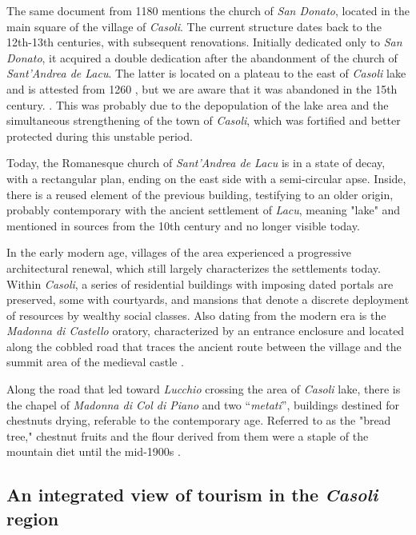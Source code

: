 \documentclass[sustainability,article,submit,pdftex,moreauthors]{Definitions/mdpi}
\begin{document}
The same document from 1180 mentions the church of \textit{San Donato}, located in the main square of the village of \emph{Casoli}. The current structure dates back to the 12th-13th centuries, with subsequent renovations. Initially dedicated only to \textit{San Donato}, it acquired a double dedication after the abandonment of the church of \textit{Sant'Andrea de Lacu}. The latter is located on a plateau to the east of \emph{Casoli} lake and is attested from 1260 \cite{ber18, gia96, cap17}, but we are aware that it was abandoned in the 15th century. \cite{gia96, con12}. This was probably due to the depopulation of the lake area and the simultaneous strengthening of the town of \emph{Casoli}, which was fortified and better protected during this unstable period.

Today, the Romanesque church of \textit{Sant'Andrea de Lacu} is in a state of decay, with a rectangular plan, ending on the east side with a semi-circular apse. Inside, there is a reused element of the previous building, testifying to an older origin, probably contemporary with the ancient settlement of \textit{Lacu}, meaning "lake" and mentioned in sources from the 10th century and no longer visible today.

In the early modern age, villages of the area experienced a progressive architectural renewal, which still largely characterizes the settlements today. Within \emph{Casoli}, a series of residential buildings with imposing dated portals are preserved, some with courtyards, and mansions that denote a discrete deployment of resources by wealthy social classes. Also dating from the modern era is the \textit{Madonna di Castello} oratory, characterized by an entrance enclosure and located along the cobbled road that traces the ancient route between the village and the summit area of the medieval castle \cite{gia96}.

Along the road that led toward \textit{Lucchio} crossing the area of \emph{Casoli} lake, there is the chapel of \textit{Madonna di Col di Piano} and two “\textit{metati}”, buildings destined for chestnuts drying, referable to the contemporary age. Referred to as the "bread tree," chestnut fruits and the flour derived from them were a staple of the mountain diet until the mid-1900s \cite{buc92, puc10}.


\subsection{An integrated view of tourism in the \emph{Casoli} region \label{sec:tourism}}
\end{document}
